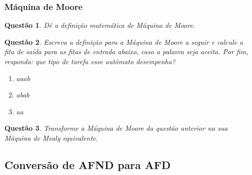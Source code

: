 \documentclass{article}
\newtheorem{problem}{Questão}
\begin{document}
        \subsubsection{Máquina de Moore}
            \begin{problem}
                    Dê a definição matemática de Máquina de Moore.
            \end{problem}
            \begin{solution}
        
    \end{solution}
            \begin{problem}
                Escreva a definição para a Máquina de Moore a seguir e calcule a fita de saída para as fitas de entrada abaixo, caso a palavra seja aceita. Por fim, responda: que tipo de tarefa esse autômato desempenha? 
                 
                \begin{enumerate}[label=(\alph*)]
                        \item aaab
                        \item abab
                        \item aa
                    \end{enumerate}
                 
            \end{problem}
            \begin{solution}
        
    \end{solution}
            \begin{problem}
                  Transforme a Máquina de Moore da questão anterior na sua Máquina de Mealy equivalente.
            \end{problem}
            \begin{solution}
        
    \end{solution}
    \subsection{Conversão de AFND para AFD}
\end{document}
